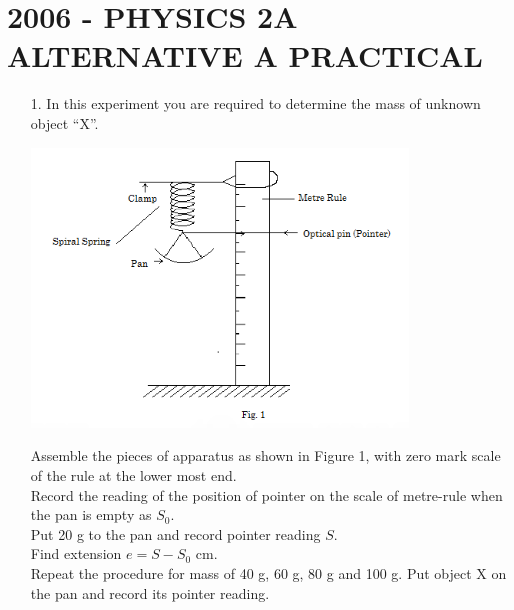 \section{2006 - PHYSICS 2A ALTERNATIVE A PRACTICAL}

\begin{enumerate}
\item[1.] In this experiment you are required to determine the mass of unknown object ``X''.

\begin{center}
\includegraphics[width=10cm]{./img/2006-1-alt.png}
\end{center}

Assemble the pieces of apparatus as shown in Figure 1, with zero mark scale of the rule at the lower most end.\\

Record the reading of the position of pointer on the scale of metre-rule when the pan is empty as $S_0$.\\

Put 20 g to the pan and record pointer reading $S$.\\

Find extension $e = S - S_0$ cm.\\

Repeat the procedure for mass of 40 g, 60 g, 80 g and 100 g. Put object X on the pan and record its pointer reading.


\end{enumerate}
